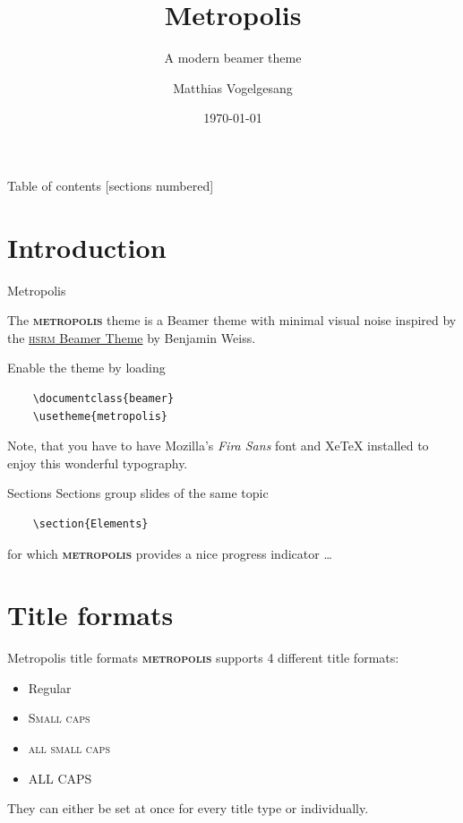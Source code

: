 \documentclass[10pt]{ctexbeamer}
\title{Metropolis}
\subtitle{A modern beamer theme}
\date{\today}
\author{Matthias Vogelgesang}
\institute{Center for modern beamer themes}
\newcommand{\themename}{\textbf{\textsc{metropolis}}\xspace}
\begin{document}
\maketitle

\begin{frame}{Table of contents}
  [sections numbered]
  \tableofcontents[hideallsubsections]
\end{frame}

\section{Introduction}

\begin{frame}[fragile]{Metropolis}

  The \themename theme is a Beamer theme with minimal visual noise
  inspired by the \href{https://github.com/hsrmbeamertheme/hsrmbeamertheme}{\textsc{hsrm} Beamer
  Theme} by Benjamin Weiss.

  Enable the theme by loading

  \begin{verbatim}    \documentclass{beamer}
    \usetheme{metropolis}\end{verbatim}

  Note, that you have to have Mozilla's \emph{Fira Sans} font and XeTeX
  installed to enjoy this wonderful typography.
\end{frame}
\begin{frame}[fragile]{Sections}
  Sections group slides of the same topic

  \begin{verbatim}    \section{Elements}\end{verbatim}

  for which \themename provides a nice progress indicator \ldots
\end{frame}

\section{Title formats}

\begin{frame}{Metropolis title formats}
	\themename supports 4 different title formats:
	\begin{itemize}
		\item Regular
		\item \textsc{Small caps}
		\item \textsc{all small caps}
		\item ALL CAPS
	\end{itemize}
	They can either be set at once for every title type or individually.
\end{frame}
\end{document}

